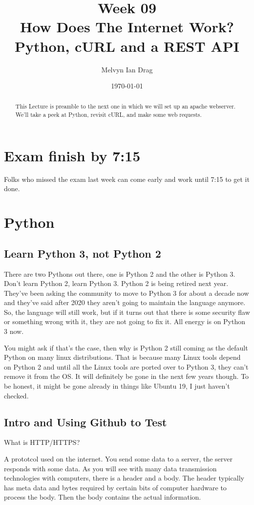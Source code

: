 \documentclass[12pt]{article}
\title{\textbf{Week 09} \\
\Large How Does The Internet Work? Python, cURL and a REST API}
\author{
	Melvyn Ian Drag
}
\date{\today}
\begin{document}
\maketitle

\begin{abstract}
This Lecture is preamble to the next one in which we will set up an apache webserver. We'll take a peek at Python, revisit cURL, and make some web requests.
\end{abstract}


\section{Exam finish by 7:15}
Folks who missed the exam last week can come early and work until 7:15 to get it done.

\section{Python}
\subsection{Learn Python 3, not Python 2}
There are two Pythons out there, one is Python 2 and the other is Python 3. Don't learn Python 2, learn Python 3. Python 2 is being retired next year. They've been asking the community to move to Python 3 for about a decade now and they've said after 2020 they aren't going to maintain the language anymore. So, the language will still work, but if it turns out that there is some security flaw or something wrong with it, they are not going to fix it. All energy is on Python 3 now. 

You might ask if that's the case, then why is Python 2 still coming as the default Python on many linux distributions. That is because many Linux tools depend on Python 2 and until all the Linux tools are ported over to Python 3, they can't remove it from the OS. It will definitely be gone in the next few years though. To be honest, it might be gone already in things like Ubuntu 19, I just haven't checked.

\subsection{Intro and Using Github to Test}
What is HTTP/HTTPS?

A prototcol used on the internet. You send some data to a server, the server responds with some data. As you will see with many data transmission technologies with computers, there is a header and a body. The header typically has meta data and bytes required by certain bits of computer hardware to process the body. Then the body contains the actual information.
\end{document}
